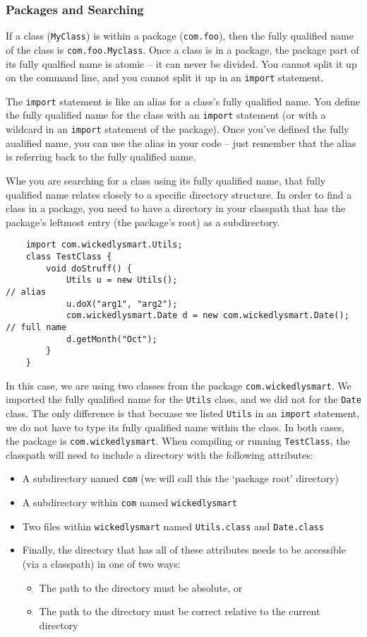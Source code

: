 \subsubsection{Packages and Searching}
If a class (\verb#MyClass#) is within a package (\verb#com.foo#), then the 
fully qualified name of the class is \verb#com.foo.Myclass#. Once a class is in 
a package, the package part of its fully qualfied name is atomic -- it can 
never be divided. You cannot split it up on the command line, and you cannot 
split it up in an \verb#import# statement.

The \verb#import# statement is like an alias for a class's fully qualified 
name. You define the fully qualified name for the class with an \verb#import# 
statement (or with a wildcard in an \verb#import# statement of the package).  
Once you've defined the fully aualified name, you can use the alias in your 
code -- just remember that the alias is referring back to the fully qualified 
name.

Whe you are searching for a class using its fully qualified name, that fully 
qualified name relates closely to a specific directory structure. In order to 
find a class in a package, you need to have a directory in your classpath that 
has the package's leftmost entry (the package's root) as a subdirectory.
\begin{verbatim}
    import com.wickedlysmart.Utils;
    class TestClass {
        void doStruff() {
            Utils u = new Utils();                                      // alias
            u.doX("arg1", "arg2");
            com.wickedlysmart.Date d = new com.wickedlysmart.Date();    // full name
            d.getMonth("Oct");
        }
    }
\end{verbatim}
In this case, we are using two classes from the package 
\verb#com.wickedlysmart#. We imported the fully qualified name for the 
\verb#Utils# class, and we did not for the \verb#Date# class. The only 
difference is that becuase we listed \verb#Utils# in an \verb#import# 
statement, we do not have to type its fully qualified name within the class. In 
both cases, the package is \verb#com.wickedlysmart#. When compiling or running 
\verb#TestClass#, the classpath will need to include a directory with the 
following attributes:
\begin{itemize}
    \item A subdirectory named \verb#com# (we will call this the `package root' 
    directory)
    \item A subdirectory within \verb#com# named \verb#wickedlysmart#
    \item Two files within \verb#wickedlysmart# named \verb#Utils.class# and 
    \verb#Date.class#
    \item Finally, the directory that has all of these attributes needs to be 
    accessible (via a classpath) in one of two ways:
    \begin{itemize}
        \item The path to the directory must be absolute, or
        \item The path to the directory must be correct relative to the current 
        directory
    \end{itemize}
\end{itemize}

